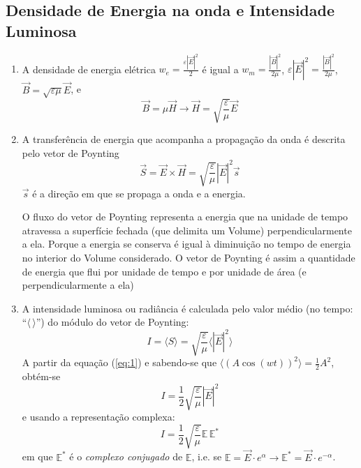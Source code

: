 \documentclass[a4paper,12pt]{article}
\begin{document}
\subsection{\sf Densidade de Energia na onda e Intensidade Luminosa}
\begin{enumerate}
\item A densidade de energia elétrica $w_e= \frac{\varepsilon |\vec{E}|^2}{2}$ é igual a
$w_m= \frac{ |\vec{B}|^2}{2\mu}$, $\varepsilon |\vec{E}|^2 = \frac{ |\vec{B}|^2}{2\mu}$, $\vec{B} = \sqrt{\varepsilon \mu} \vec{E}$, e
	 \begin{equation}
		\vec{B} = \mu \vec{H} \to \vec{H}= \sqrt{\frac{ \varepsilon}{\mu}} \vec{E} 
	\end{equation}
	\item A transferência de energia que acompanha a propagação da onda é descrita pelo vetor de Poynting 
	\begin{equation}
		\vec{S} = \vec{E} \times \vec{H} = \sqrt{\frac{ \varepsilon}{\mu}} |\vec{E}|^2 \vec{s} 
	\end{equation}
	$ \vec{s}$ é a direção em que se propaga a onda e a energia.
	
	O fluxo do vetor de Poynting representa a energia que na unidade de tempo atravessa a superfície fechada (que delimita um Volume) perpendicularmente a ela. Porque a energia se conserva é igual à diminuição no tempo de energia no interior do Volume considerado.
	O vetor de Poynting é assim a quantidade de energia que flui por unidade de tempo e por unidade de área (e perpendicularmente a ela) 
	 
	\item A intensidade luminosa ou radiância é calculada pelo valor médio (no tempo: “$\langle \, \rangle$”) do módulo do vetor de Poynting: 
	\begin{equation}
		I = \langle S \rangle = \sqrt{\frac{ \varepsilon}{\mu}} \langle |\vec{E}|^2 \rangle \label{eq:5} 
	\end{equation}
	A partir da equação (\ref{eq:1}) e sabendo-se que  $\langle (A \cos(wt) )^2  \rangle =\frac{1}{2} A^2$,  obtém-se 
	\begin{equation}
		\label{eq:6} I = \frac{1}{2}\sqrt{\frac{ \varepsilon}{\mu}} |\vec{E}|^2 
	\end{equation}
	e usando a representação complexa: 
	\begin{equation}
		\label{eq:7} I = \frac{1}{2}\sqrt{\frac{ \varepsilon}{\mu}}  \mathbb{E}\, \mathbb{E}^* 
	\end{equation}
	em que $\mathbb{E}^*$ é o \emph{complexo conjugado} de $\mathbb{E}$, i.e. se $\mathbb{E} = \vec{E} \cdot e^{ \alpha} \to \mathbb{E}^* = \vec{E} \cdot e^{- \alpha}$.
\end{enumerate}
\end{document}
